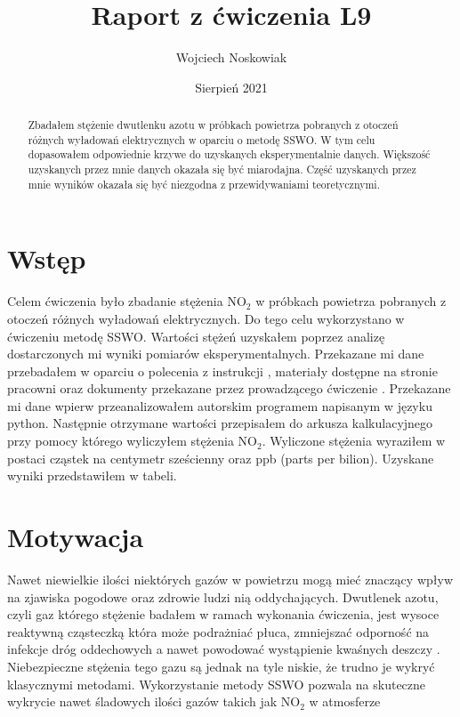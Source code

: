 \documentclass[10pt,a4paper]{article}
\author{Wojciech Noskowiak}
\title{Raport z ćwiczenia L9}
\date{Sierpień 2021}
\begin{document}
\maketitle
\tableofcontents

\begin{abstract}
    Zbadałem stężenie dwutlenku azotu w próbkach powietrza pobranych z otoczeń różnych wyładowań elektrycznych w oparciu o metodę SSWO. W tym celu dopasowałem odpowiednie krzywe do uzyskanych eksperymentalnie danych. Większość uzyskanych przez mnie danych okazała się być miarodajna. Część uzyskanych przez mnie wyników okazała się być niezgodna z przewidywaniami teoretycznymi.
\end{abstract}

\newpage

\section*{Wstęp}
Celem ćwiczenia było zbadanie stężenia $\text{NO}_{\text{2}}$ w próbkach powietrza pobranych z otoczeń różnych wyładowań elektrycznych. Do tego celu wykorzystano w ćwiczeniu metodę SSWO. Wartości stężeń uzyskałem poprzez analizę dostarczonych mi wyniki pomiarów eksperymentalnych. Przekazane mi dane przebadałem w oparciu o polecenia z instrukcji \cite{instrukcja}, materiały dostępne na stronie pracowni \cite{strona} oraz dokumenty przekazane przez prowadzącego ćwiczenie \cite{sswo}. Przekazane mi dane wpierw przeanalizowałem autorskim programem napisanym w języku python. Następnie otrzymane wartości przepisałem do arkusza kalkulacyjnego przy pomocy którego wyliczyłem stężenia $\text{NO}_{\text{2}}$. Wyliczone stężenia wyraziłem w postaci cząstek na centymetr sześcienny oraz ppb (parts per bilion). Uzyskane wyniki przedstawiłem w tabeli.

\section{Motywacja}
Nawet niewielkie ilości niektórych gazów w powietrzu mogą mieć znaczący wpływ na zjawiska pogodowe oraz zdrowie ludzi nią oddychających. Dwutlenek azotu, czyli gaz którego stężenie badałem w ramach wykonania ćwiczenia, jest wysoce reaktywną cząsteczką która może podrażniać płuca, zmniejszać odporność na infekcje dróg oddechowych a nawet powodować wystąpienie kwaśnych deszczy \cite{sswo}. Niebezpieczne stężenia tego gazu są jednak na tyle niskie, że trudno je wykryć klasycznymi metodami. Wykorzystanie metody SSWO pozwala na skuteczne wykrycie nawet śladowych ilości gazów takich jak $\text{NO}_{\text{2}}$ w atmosferze \cite{strona}
\end{document}
